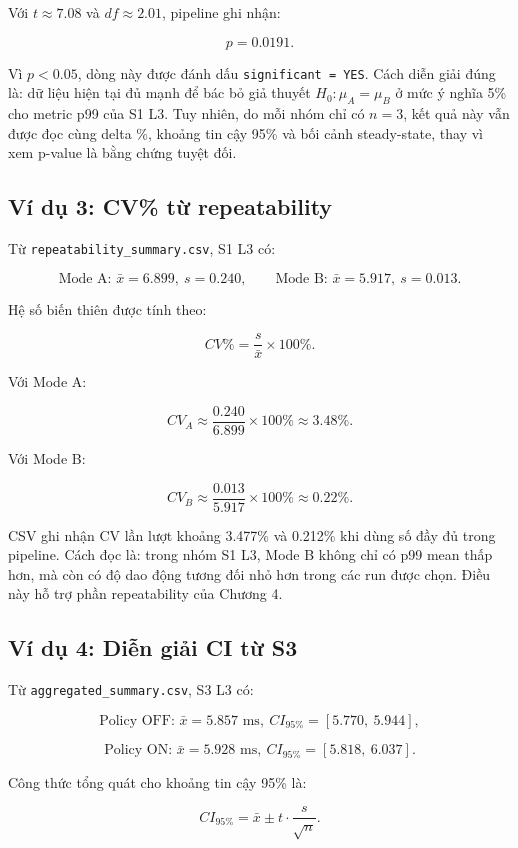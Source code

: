 Với \(t \approx 7.08\) và \(df \approx 2.01\), pipeline ghi nhận:

\[
p = 0.0191.
\]

Vì \(p < 0.05\), dòng này được đánh dấu \texttt{significant = YES}. Cách diễn giải đúng là: dữ liệu hiện tại đủ mạnh để bác bỏ giả thuyết \(H_0: \mu_A=\mu_B\) ở mức ý nghĩa 5\% cho metric p99 của S1 L3. Tuy nhiên, do mỗi nhóm chỉ có \(n=3\), kết quả này vẫn được đọc cùng delta \%, khoảng tin cậy 95\% và bối cảnh steady-state, thay vì xem p-value là bằng chứng tuyệt đối.

\subsection{Ví dụ 3: CV\% từ repeatability}

Từ \texttt{repeatability\_summary.csv}, S1 L3 có:

\[
\text{Mode A: } \bar{x}=6.899,\ s=0.240, \qquad
\text{Mode B: } \bar{x}=5.917,\ s=0.013.
\]

Hệ số biến thiên được tính theo:

\[
CV\% = \frac{s}{\bar{x}} \times 100\%.
\]

Với Mode A:

\[
CV_A \approx \frac{0.240}{6.899} \times 100\% \approx 3.48\%.
\]

Với Mode B:

\[
CV_B \approx \frac{0.013}{5.917} \times 100\% \approx 0.22\%.
\]

CSV ghi nhận CV lần lượt khoảng 3.477\% và 0.212\% khi dùng số đầy đủ trong pipeline. Cách đọc là: trong nhóm S1 L3, Mode B không chỉ có p99 mean thấp hơn, mà còn có độ dao động tương đối nhỏ hơn trong các run được chọn. Điều này hỗ trợ phần repeatability của Chương 4.

\subsection{Ví dụ 4: Diễn giải CI từ S3}

Từ \texttt{aggregated\_summary.csv}, S3 L3 có:

\[
\text{Policy OFF: } \bar{x}=5.857 \text{ ms},\ CI_{95\%}=[5.770,\ 5.944],
\]

\[
\text{Policy ON: } \bar{x}=5.928 \text{ ms},\ CI_{95\%}=[5.818,\ 6.037].
\]

Công thức tổng quát cho khoảng tin cậy 95\% là:

\[
CI_{95\%} = \bar{x} \pm t \cdot \frac{s}{\sqrt{n}}.
\]

